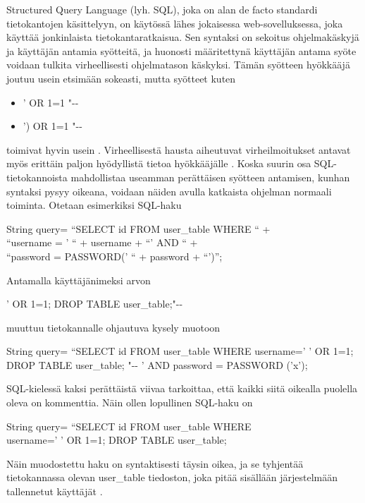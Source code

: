 Structured Query Language (lyh. SQL), joka on alan de facto standardi tietokantojen käsittelyyn, on käytössä lähes jokaisessa
web-sovelluksessa, joka käyttää jonkinlaista tietokantaratkaisua. Sen syntaksi on sekoitus ohjelmakäskyjä ja käyttäjän antamia
syötteitä, ja huonosti määritettynä käyttäjän antama syöte voidaan tulkita virheellisesti ohjelmatason käskyksi. Tämän syötteen
hyökkääjä joutuu usein etsimään sokeasti, mutta syötteet kuten

\begin{itemize}
\item ' OR 1=1 "{-}{-}
\item ') OR 1=1 "{-}{-}
\end {itemize}
toimivat hyvin usein \cite{WEB2}. Virheellisestä hausta aiheutuvat virheilmoitukset antavat myös erittäin paljon
hyödyllistä tietoa hyökkääjälle \cite{SQLSS}. Koska suurin osa SQL-tietokannoista mahdollistaa useamman perättäisen syötteen 
antamisen, kunhan syntaksi pysyy oikeana, voidaan näiden avulla katkaista ohjelman normaali toiminta. Otetaan esimerkiksi SQL-haku
\begin{tt}
\begin{center}
String query= ``SELECT id FROM user\_table WHERE `` + \\
``username = ' `` + username + ``' AND `` + \\
``password = PASSWORD(' `` + password + ``')''; \\
\end{center}
\end{tt}
Antamalla käyttäjänimeksi arvon

\begin{tt}
\begin{center}
' OR 1=1; DROP TABLE user\_table;"{-}{-}
\end{center}
\end{tt}
muuttuu tietokannalle ohjautuva kysely muotoon

\begin{tt}
\begin{center}
String query= ``SELECT id FROM user\_table WHERE username=' ' OR 1=1; DROP TABLE
user\_table; "{-}{-} ' AND password = PASSWORD ('x');
\end{center}
\end{tt}
SQL-kielessä kaksi perättäistä viivaa tarkoittaa, että kaikki siitä oikealla puolella oleva on kommenttia. 
Näin ollen lopullinen SQL-haku on 

\begin{tt}
\begin{center}
String query= ``SELECT id FROM user\_table WHERE \\username=' ' OR 1=1; DROP TABLE
user\_table;
\end{center}
\end{tt}
Näin muodostettu haku on syntaktisesti täysin oikea, ja se tyhjentää tietokannassa olevan user\_table tiedoston, joka pitää
sisällään järjestelmään tallennetut käyttäjät \cite{WEB2}. 

